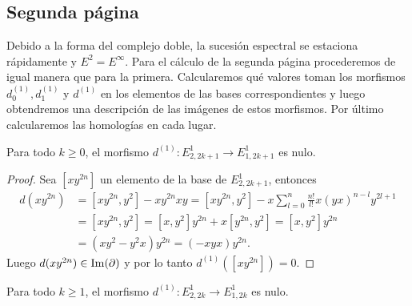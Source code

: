 \documentclass[fleqn,../tesis.tex]{subfiles}
\begin{document}
\subsection{Segunda página}
Debido a la forma del complejo doble, la sucesión espectral se estaciona rápidamente y $E^2 = E^{\infty}$. Para el cálculo de la segunda página procederemos de igual manera que para la primera. Calcularemos
qué valores toman los morfismos $d_0^{(1)}, d_1^{(1)}$ y $d^{(1)}$ en los elementos de las bases correspondientes y luego obtendremos una descripción
de las imágenes de estos morfismos. Por último calcularemos las homologías en cada lugar.
\begin{prop} \label{prop_imad1impar}
    Para todo $k \geq 0$, el morfismo $d^{(1)}: E_{2, 2k + 1}^1 \to E_{1, 2k + 1}^1$ es nulo.
\end{prop}
\begin{proof}
	Sea $\left[xy^{2n}\right]$ un elemento de la base de $E_{2, 2k + 1}^1$, entonces
	\begin{align*}
		d(xy^{2n}) &= \left[ xy^{2n}, y^2 \right] - xy^{2n}xy
			= \left[ xy^{2n}, y^2 \right] - x\sum_{l = 0}^n\frac{n!}{l!}x(yx)^{n - l}y^{2l + 1}  \\
		&= \left[ xy^{2n}, y^2 \right] = \left[x, y^2 \right]y^{2n} + x\left[y^{2n}, y^2\right] =  \left[x, y^2 \right]y^{2n} \\
		&= (xy^2 - y^2x)y^{2n} = (-xyx)y^{2n}. 
	\end{align*}
	Luego $d(xy^{2n}) \in \operatorname{Im}(\partial)$ y por lo tanto $d^{(1)}(\left[xy^{2n}\right]) = 0$.
	\end{proof}
\begin{prop}  \label{prop_imad1par}
Para todo $k \geq 1$, el morfismo $d^{(1)}: E_{2, 2k}^1 \to E_{1, 2k}^1$ es nulo.
\end{prop}
\end{document}
